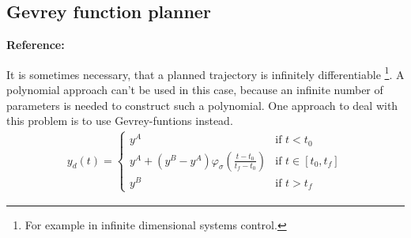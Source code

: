 \documentclass[a4paper,11pt,headings=standardclasses,parskip=half]{scrartcl}
\begin{document}
\begin{appendices}
\section{Gevrey function planner}
\textbf{Reference:}


It is sometimes necessary, that a planned trajectory is infinitely differentiable \footnote{For example in infinite dimensional systems control.}. A polynomial approach can't be used in this case, because an infinite number of parameters is needed to construct such a polynomial. One approach to deal with this problem is to use Gevrey-funtions instead.
\begin{align*}
y_d(t) = \begin{cases} y^A & \textrm{if } t<t_0 \\ 
y^A + (y^B-y^A)\varphi_\sigma\left(\frac{t-t_0}{t_f-t_0}\right) &\textrm{if } t \in [t_0, t_f] \\ 
y^B &\textrm{if } t>t_f\end{cases}
\end{align*}

\end{appendices}
\end{document}

